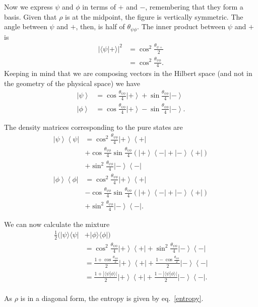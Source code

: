 \documentclass[10pt,twocolumn, nofootinbib]{revtex4-2}
\begin{document}
Now we express $\psi$ and $\phi$ in terms of $+$ and $-$, remembering that they form a basis. Given that $\rho$ is at the midpoint, the figure is vertically symmetric. The angle between $\psi$ and $+$, then, is half of $\theta_{\psi\phi}$. The inner product between $\psi$ and $+$ is
\begin{equation}
	\begin{aligned}
	|\langle \psi | + \rangle |^2 &= \cos^2 \frac{\theta_{\psi +}}{2} \\
&= \cos^2 \frac{\theta_{\psi\phi}}{4}.
	\end{aligned}
\end{equation}
Keeping in mind that we are composing vectors in the Hilbert space (and not in the geometry of the physical space) we have
\begin{align*}
	\left|\psi\right>&=\cos\frac{\theta_{\psi\phi}}{4}\left|+\right>+\sin\frac{\theta_{\psi\phi}}{4}\left|-\right> \\
	\left|\phi\right>&=\cos\frac{\theta_{\psi\phi}}{4}\left|+\right>-\sin\frac{\theta_{\psi\phi}}{4}\left|-\right>.
\end{align*}

The density matrices corresponding to the pure states are
\begin{align*}
	\left|\psi\right>\left<\psi\right|&=\cos^2\frac{\theta_{\psi\phi}}{4}\left|+\right>\left<+\right|\\
	&+\cos\frac{\theta_{\psi\phi}}{4}\sin\frac{\theta_{\psi\phi}}{4}\left(\left|+\right>\left<-\right|+\left|-\right>\left<+\right|\right) \\
	&+\sin^2\frac{\theta_{\psi\phi}}{4}\left|-\right>\left<-\right| \\
	\left|\phi\right>\left<\phi\right|&=\cos^2\frac{\theta_{\psi\phi}}{4}\left|+\right>\left<+\right|\\
	&-\cos\frac{\theta_{\psi\phi}}{4}\sin\frac{\theta_{\psi\phi}}{4}\left(\left|+\right>\left<-\right|+\left|-\right>\left<+\right|\right) \\
	&+\sin^2\frac{\theta_{\psi\phi}}{4}\left|-\right>\left<-\right|.
\end{align*}

We can now calculate the mixture
\begin{align*}
	\frac{1}{2}(|\psi\rangle\langle\psi| &+ |\phi\rangle\langle\phi|) \\
	&=\cos^2\frac{\theta_{\psi\phi}}{4}\left|+\right>\left<+\right| +\sin^2\frac{\theta_{\psi\phi}}{4}\left|-\right>\left<-\right| \\
	&=\frac{1+\cos\frac{\theta_{\psi\phi}}{2}}{2}\left|+\right>\left<+\right| +\frac{1-\cos\frac{\theta_{\psi\phi}}{2}}{2}\left|-\right>\left<-\right| \\
	&=\frac{1+|\langle\psi|\phi\rangle|}{2}\left|+\right>\left<+\right| +\frac{1-|\langle\psi|\phi\rangle|}{2}\left|-\right>\left<-\right|. \\
\end{align*}

As $\rho$ is in a diagonal form, the entropy is given by eq.~\ref{entropy}.
\end{document}
